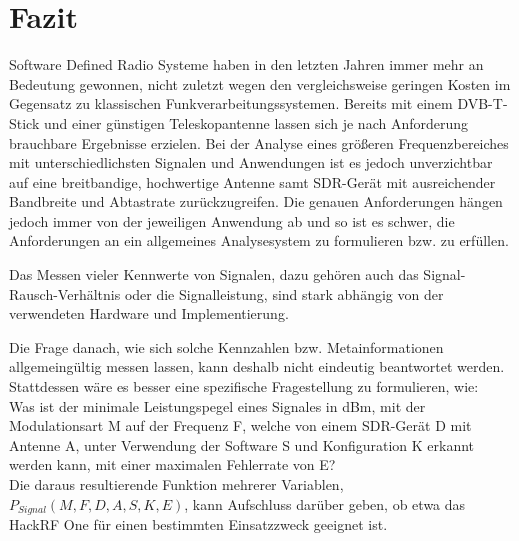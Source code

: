 
\chapter{Fazit}
\label{kap5}
Software Defined Radio Systeme haben in den letzten Jahren immer mehr an Bedeutung gewonnen, nicht zuletzt wegen den vergleichsweise geringen Kosten im Gegensatz zu klassischen Funkverarbeitungssystemen.
Bereits mit einem DVB-T-Stick und einer günstigen Teleskopantenne lassen sich je nach Anforderung brauchbare Ergebnisse erzielen. Bei der Analyse eines größeren Frequenzbereiches mit unterschiedlichsten Signalen und Anwendungen ist es jedoch unverzichtbar auf eine breitbandige, hochwertige Antenne samt SDR-Gerät mit ausreichender Bandbreite und Abtastrate zurückzugreifen. Die genauen Anforderungen hängen jedoch immer von der jeweiligen Anwendung ab und so ist es schwer, die Anforderungen an ein allgemeines Analysesystem zu formulieren bzw. zu erfüllen.

Das Messen vieler Kennwerte von Signalen, dazu gehören auch das Signal-Rausch-Verhältnis oder die Signalleistung, sind stark abhängig von der verwendeten Hardware und Implementierung.

Die Frage danach, wie sich solche Kennzahlen bzw. Metainformationen allgemeingültig messen lassen, kann deshalb nicht eindeutig beantwortet werden.
Stattdessen wäre es besser eine spezifische Fragestellung zu formulieren, wie: \\
Was ist der minimale Leistungspegel eines Signales in dBm, mit der Modulationsart M auf der Frequenz F, welche von einem SDR-Gerät D mit Antenne A, unter Verwendung der Software S und Konfiguration K erkannt werden kann, mit einer maximalen Fehlerrate von E?\\
Die daraus resultierende Funktion mehrerer Variablen, \(P_{Signal} (M, F, D, A, S, K, E)\), kann Aufschluss darüber geben, ob etwa das HackRF One für einen bestimmten Einsatzzweck geeignet ist.


